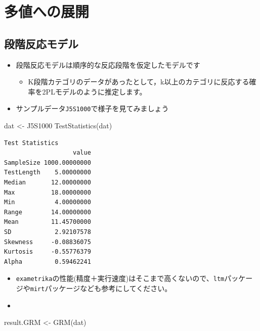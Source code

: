 \documentclass[
  a4paper,
]{ltjsbook}
\newenvironment{Shaded}{\begin{snugshade}}{\end{snugshade}}
\newcommand{\FunctionTok}[1]{\textcolor[rgb]{0.28,0.35,0.67}{#1}}
\newcommand{\NormalTok}[1]{\textcolor[rgb]{0.00,0.23,0.31}{#1}}
\newcommand{\OtherTok}[1]{\textcolor[rgb]{0.00,0.23,0.31}{#1}}
\providecommand{\tightlist}{%
  \setlength{\itemsep}{0pt}\setlength{\parskip}{0pt}}\usepackage{longtable,booktabs,array}
\begin{document}
\section{多値への展開}\label{ux591aux5024ux3078ux306eux5c55ux958b-1}

\subsection{段階反応モデル}\label{ux6bb5ux968eux53cdux5fdcux30e2ux30c7ux30eb}

\begin{itemize}
\tightlist
\item
  段階反応モデルは順序的な反応段階を仮定したモデルです

  \begin{itemize}
  \tightlist
  \item
    K段階カテゴリのデータがあったとして，k以上のカテゴリに反応する確率を2PLモデルのように推定します。
  \end{itemize}
\item
  サンプルデータ\texttt{J5S1000}で様子を見てみましょう
\end{itemize}

\begin{Shaded}
\begin{Highlighting}[]
\NormalTok{dat }\OtherTok{\textless{}{-}}\NormalTok{ J5S1000}
\FunctionTok{TestStatistics}\NormalTok{(dat)}
\end{Highlighting}
\end{Shaded}

\begin{verbatim}
Test Statistics
                   value
SampleSize 1000.00000000
TestLength    5.00000000
Median       12.00000000
Max          18.00000000
Min           4.00000000
Range        14.00000000
Mean         11.45700000
SD            2.92107578
Skewness     -0.08836075
Kurtosis     -0.55776379
Alpha         0.59462241
\end{verbatim}

\begin{itemize}
\tightlist
\item
  \texttt{exametrika}の性能(精度＋実行速度)はそこまで高くないので、\texttt{ltm}パッケージや\texttt{mirt}パッケージなども参考にしてください。
\item
\end{itemize}

\begin{Shaded}
\begin{Highlighting}[]
\NormalTok{result.GRM }\OtherTok{\textless{}{-}} \FunctionTok{GRM}\NormalTok{(dat)}
\end{Highlighting}
\end{Shaded}
\end{document}
